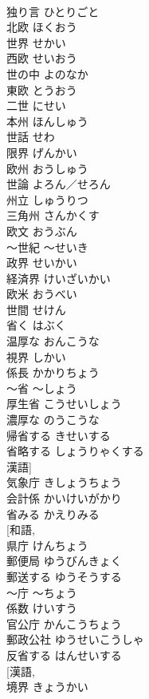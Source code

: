 \documentclass[8pt]{extreport}
\begin{document}
\begin{CJK}{UTF8}{min}
\\	独り言	ひとりごと	
\\	北欧	ほくおう	
\\	世界	せかい	
\\	西欧	せいおう	
\\	世の中	よのなか	
\\	東欧	とうおう	
\\	二世	にせい	
\\	本州	ほんしゅう	
\\	世話	せわ	
\\	限界	げんかい	
\\	欧州	おうしゅう	
\\	世論	よろん／せろん	
\\	州立	しゅうりつ	
\\	三角州	さんかくす	
\\	欧文	おうぶん	
\\	～世紀	～せいき	
\\	政界	せいかい	
\\	経済界	けいざいかい	
\\	欧米	おうべい	
\\	世間	せけん	
\\	省く	はぶく	
\\	温厚な	おんこうな	
\\	視界	しかい	
\\	係長	かかりちょう	
\\	～省	～しょう	
\\	厚生省	こうせいしょう	
\\	濃厚な	のうこうな	
\\	帰省する	きせいする	
\\	省略する	しょうりゃくする	
\\	漢語]
\\	気象庁	きしょうちょう	
\\	会計係	かいけいがかり	
\\	省みる	かえりみる	
\\	[和語, 
\\	県庁	けんちょう	
\\	郵便局	ゆうびんきょく	
\\	郵送する	ゆうそうする	
\\	～庁	～ちょう	
\\	係数	けいすう	
\\	官公庁	かんこうちょう	
\\	郵政公社	ゆうせいこうしゃ	
\\	反省する	はんせいする	
\\	[漢語, 
\\	境界	きょうかい	

\end{CJK}
\end{document}

